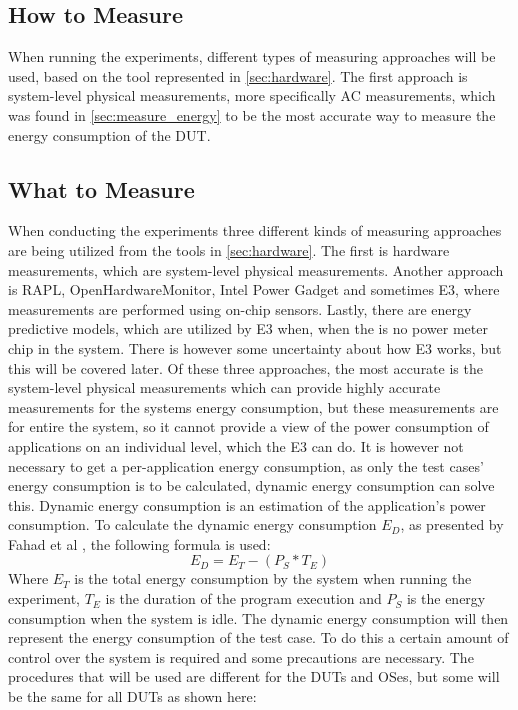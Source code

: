 \subsection{How to Measure}
When running the experiments, different types of measuring approaches will be used, based on the tool represented in \cref*{sec:hardware}. The first approach is system-level physical measurements, more specifically AC measurements, which was found in \cref*{sec:measure_energy} to be the most accurate way to measure the energy consumption of the DUT.


\subsection{What to Measure}










When conducting the experiments three different kinds of measuring approaches are being utilized from the tools in \cref{sec:hardware}.
The first is hardware measurements, which are system-level physical measurements. Another approach is RAPL, OpenHardwareMonitor, Intel Power Gadget and sometimes E3, where measurements are performed using on-chip sensors. Lastly, there are energy predictive models, which are utilized by E3 when, when the is no power meter chip in the system. There is however some uncertainty about how E3 works, but this will be covered later. Of these three approaches, the most accurate is the system-level physical measurements which can provide highly accurate measurements for the systems energy consumption, but these measurements are for entire the system, so it cannot provide a view of the power consumption of applications on an individual level, which the E3 can do. It is however not necessary to get a per-application energy consumption, as only the test cases' energy consumption is to be calculated, dynamic energy consumption can solve this. Dynamic energy consumption is an estimation of the application's power consumption. To calculate the dynamic energy consumption $E_D$, as presented by Fahad et al \cite{fahad2019comparative}, the following formula is used:
$$E_D = E_T -(P_S * T_E)$$
Where $E_T$ is the total energy consumption by the system when running the experiment, $T_E$ is the duration of the program execution and $P_S$ is the energy consumption when the system is idle. The dynamic energy consumption will then represent the energy consumption of the test case. To do this a certain amount of control over the system is required and some precautions are necessary. The procedures that will be used are different for the DUTs and OSes, but some will be the same for all DUTs as shown here:\cite*{fahad2019comparative}

